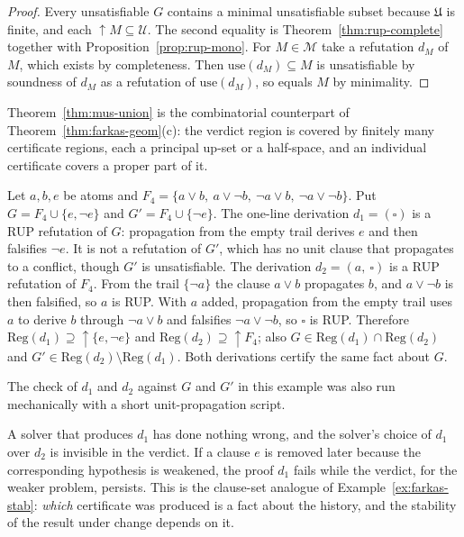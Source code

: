 \begin{proof}
Every unsatisfiable $G$ contains a minimal unsatisfiable subset because $\mathfrak U$ is finite, and each $\uparrow M\subseteq\mathcal U$. The second equality is Theorem~\ref{thm:rup-complete} together with Proposition~\ref{prop:rup-mono}. For $M\in\mathcal M$ take a refutation $d_M$ of $M$, which exists by completeness. Then $\mathrm{use}(d_M)\subseteq M$ is unsatisfiable by soundness of $d_M$ as a refutation of $\mathrm{use}(d_M)$, so equals $M$ by minimality.
\end{proof}

Theorem~\ref{thm:mus-union} is the combinatorial counterpart of Theorem~\ref{thm:farkas-geom}(c): the verdict region is covered by finitely many certificate regions, each a principal up-set or a half-space, and an individual certificate covers a proper part of it.

\begin{example}
\label{ex:two-regions}
Let $a,b,e$ be atoms and $F_4=\{a\vee b,\ a\vee\neg b,\ \neg a\vee b,\ \neg a\vee\neg b\}$. Put $G=F_4\cup\{e,\neg e\}$ and $G'=F_4\cup\{\neg e\}$. The one-line derivation $d_1=(\square)$ is a RUP refutation of $G$: propagation from the empty trail derives $e$ and then falsifies $\neg e$. It is not a refutation of $G'$, which has no unit clause that propagates to a conflict, though $G'$ is unsatisfiable. The derivation $d_2=(a,\ \square)$ is a RUP refutation of $F_4$. From the trail $\{\neg a\}$ the clause $a\vee b$ propagates $b$, and $a\vee\neg b$ is then falsified, so $a$ is RUP. With $a$ added, propagation from the empty trail uses $a$ to derive $b$ through $\neg a\vee b$ and falsifies $\neg a\vee\neg b$, so $\square$ is RUP. Therefore $\mathrm{Reg}(d_1)\supseteq\uparrow\{e,\neg e\}$ and $\mathrm{Reg}(d_2)\supseteq\uparrow F_4$; also $G\in\mathrm{Reg}(d_1)\cap\mathrm{Reg}(d_2)$ and $G'\in\mathrm{Reg}(d_2)\setminus\mathrm{Reg}(d_1)$. Both derivations certify the same fact about $G$.
\end{example}

\noindent The check of $d_1$ and $d_2$ against $G$ and $G'$ in this example was also run mechanically with a short unit-propagation script.

A solver that produces $d_1$ has done nothing wrong, and the solver's choice of $d_1$ over $d_2$ is invisible in the verdict. If a clause $e$ is removed later because the corresponding hypothesis is weakened, the proof $d_1$ fails while the verdict, for the weaker problem, persists. This is the clause-set analogue of Example~\ref{ex:farkas-stab}: \emph{which} certificate was produced is a fact about the history, and the stability of the result under change depends on it.


